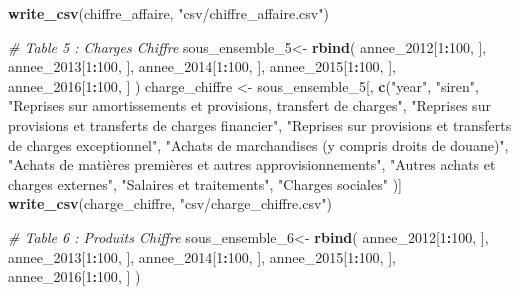 \documentclass[mstat,12pt]{unswthesis}
\newenvironment{Shaded}{\begin{snugshade}}{\end{snugshade}}
\newcommand{\CommentTok}[1]{\textcolor[rgb]{0.56,0.35,0.01}{\textit{#1}}}
\newcommand{\DecValTok}[1]{\textcolor[rgb]{0.00,0.00,0.81}{#1}}
\newcommand{\FunctionTok}[1]{\textcolor[rgb]{0.13,0.29,0.53}{\textbf{#1}}}
\newcommand{\NormalTok}[1]{#1}
\newcommand{\OtherTok}[1]{\textcolor[rgb]{0.56,0.35,0.01}{#1}}
\newcommand{\SpecialCharTok}[1]{\textcolor[rgb]{0.81,0.36,0.00}{\textbf{#1}}}
\newcommand{\StringTok}[1]{\textcolor[rgb]{0.31,0.60,0.02}{#1}}
\begin{document}
\begin{Shaded}
\begin{Highlighting}[]
\FunctionTok{write\_csv}\NormalTok{(chiffre\_affaire, }\StringTok{"csv/chiffre\_affaire.csv"}\NormalTok{)}

\CommentTok{\# Table 5 : Charges Chiffre}
\NormalTok{sous\_ensemble\_5}\OtherTok{\textless{}{-}} \FunctionTok{rbind}\NormalTok{(}
\NormalTok{  annee\_2012[}\DecValTok{1}\SpecialCharTok{:}\DecValTok{100}\NormalTok{, ],}
\NormalTok{  annee\_2013[}\DecValTok{1}\SpecialCharTok{:}\DecValTok{100}\NormalTok{, ],}
\NormalTok{  annee\_2014[}\DecValTok{1}\SpecialCharTok{:}\DecValTok{100}\NormalTok{, ],}
\NormalTok{  annee\_2015[}\DecValTok{1}\SpecialCharTok{:}\DecValTok{100}\NormalTok{, ],}
\NormalTok{  annee\_2016[}\DecValTok{1}\SpecialCharTok{:}\DecValTok{100}\NormalTok{, ]}
\NormalTok{)}
\NormalTok{charge\_chiffre }\OtherTok{\textless{}{-}}\NormalTok{ sous\_ensemble\_5[, }\FunctionTok{c}\NormalTok{(}\StringTok{"year"}\NormalTok{,}
  \StringTok{"siren"}\NormalTok{, }
  \StringTok{"Reprises sur amortissements et provisions, transfert de charges"}\NormalTok{, }
  \StringTok{"Reprises sur provisions et transferts de charges financier"}\NormalTok{, }
  \StringTok{"Reprises sur provisions et transferts de charges exceptionnel"}\NormalTok{, }
  \StringTok{"Achats de marchandises (y compris droits de douane)"}\NormalTok{, }
  \StringTok{"Achats de matières premières et autres approvisionnements"}\NormalTok{, }
  \StringTok{"Autres achats et charges externes"}\NormalTok{, }
  \StringTok{"Salaires et traitements"}\NormalTok{, }
  \StringTok{"Charges sociales"}
\NormalTok{)]}
\FunctionTok{write\_csv}\NormalTok{(charge\_chiffre, }\StringTok{"csv/charge\_chiffre.csv"}\NormalTok{)}

\CommentTok{\# Table 6 : Produits Chiffre}
\NormalTok{sous\_ensemble\_6}\OtherTok{\textless{}{-}} \FunctionTok{rbind}\NormalTok{(}
\NormalTok{  annee\_2012[}\DecValTok{1}\SpecialCharTok{:}\DecValTok{100}\NormalTok{, ],}
\NormalTok{  annee\_2013[}\DecValTok{1}\SpecialCharTok{:}\DecValTok{100}\NormalTok{, ],}
\NormalTok{  annee\_2014[}\DecValTok{1}\SpecialCharTok{:}\DecValTok{100}\NormalTok{, ],}
\NormalTok{  annee\_2015[}\DecValTok{1}\SpecialCharTok{:}\DecValTok{100}\NormalTok{, ],}
\NormalTok{  annee\_2016[}\DecValTok{1}\SpecialCharTok{:}\DecValTok{100}\NormalTok{, ]}
\NormalTok{)}



\end{Highlighting}
\end{Shaded}
\end{document}
